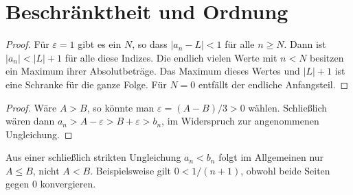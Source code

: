\documentclass[main.tex]{subfiles}
\begin{document}
\section{Beschränktheit und Ordnung}


\begin{proof}
Für \(\varepsilon=1\) gibt es ein \(N\), so dass
\(|a_n-L|<1\) für alle \(n\geq N\). Dann ist
\(|a_n|<|L|+1\) für alle diese Indizes. Die endlich vielen Werte mit
\(n<N\) besitzen ein Maximum ihrer Absolutbeträge. Das Maximum dieses
Wertes und \(|L|+1\) ist eine Schranke für die ganze Folge. Für \(N=0\)
entfällt der endliche Anfangsteil.
\end{proof}

\begin{proof}
Wäre \(A>B\), so könnte man
\(\varepsilon=(A-B)/3>0\) wählen. Schließlich wären dann
\(a_n>A-\varepsilon>B+\varepsilon>b_n\), im Widerspruch zur angenommenen
Ungleichung.
\end{proof}

Aus einer schließlich strikten Ungleichung \(a_n<b_n\) folgt im Allgemeinen
nur \(A\leq B\), nicht \(A<B\). Beispielsweise gilt
\(0<1/(n+1)\), obwohl beide Seiten gegen \(0\) konvergieren.

\end{document}
